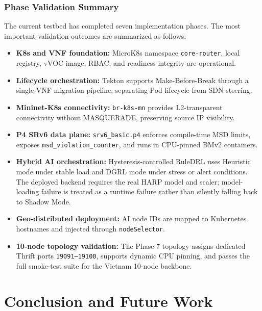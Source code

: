 \documentclass[12pt, a4paper, reqno, oneside]{book}
\begin{document}
\subsection{Phase Validation Summary}
The current testbed has completed seven implementation phases. The most important validation outcomes are summarized as follows:
\begin{itemize}
    \item \textbf{K8s and VNF foundation:} MicroK8s namespace \texttt{core-router}, local registry, vVOC image, RBAC, and readiness integrity are operational.
    \item \textbf{Lifecycle orchestration:} Tekton supports Make-Before-Break through a single-VNF migration pipeline, separating Pod lifecycle from SDN steering.
    \item \textbf{Mininet-K8s connectivity:} \texttt{br-k8s-mn} provides L2-transparent connectivity without MASQUERADE, preserving source IP visibility.
    \item \textbf{P4 SRv6 data plane:} \texttt{srv6\_basic.p4} enforces compile-time MSD limits, exposes \texttt{msd\_violation\_counter}, and runs in CPU-pinned BMv2 containers.
    \item \textbf{Hybrid AI orchestration:} Hysteresis-controlled RuleDRL uses Heuristic mode under stable load and DGRL mode under stress or alert conditions. The deployed backend requires the real HARP model and scaler; model-loading failure is treated as a runtime failure rather than silently falling back to Shadow Mode.
    \item \textbf{Geo-distributed deployment:} AI node IDs are mapped to Kubernetes hostnames and injected through \texttt{nodeSelector}.
    \item \textbf{10-node topology validation:} The Phase 7 topology assigns dedicated Thrift ports \texttt{19091--19100}, supports dynamic CPU pinning, and passes the full smoke-test suite for the Vietnam 10-node backbone.
\end{itemize}


\chapter{Conclusion and Future Work}
\label{chap:conclusions}
\end{document}
